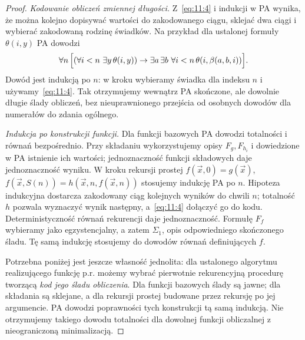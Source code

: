 \documentclass[11pt,a4paper]{article}
\numberwithin{equation}{section}
\theoremstyle{plain}
\theoremstyle{definition}
\theoremstyle{remark}
\begin{document}
\begin{proof}
\emph{Kodowanie obliczeń zmiennej długości.} Z~\eqref{eq:11:4} i indukcji w PA wynika, że można kolejno dopisywać wartości do zakodowanego ciągu, sklejać dwa ciągi i wybierać zakodowaną rodzinę świadków. Na przykład dla ustalonej formuły $\theta(i,y)$ PA dowodzi
\[
\forall n\,\Bigl[(\forall i<n\ \exists y\,\theta(i,y))
\to\exists a\,\exists b\ \forall i<n\,\theta(i,\beta(a,b,i))\Bigr].
\]
Dowód jest indukcją po $n$: w kroku wybieramy świadka dla indeksu $n$ i używamy~\eqref{eq:11:4}. Tak otrzymujemy wewnątrz PA skończone, ale dowolnie długie ślady obliczeń, bez nieuprawnionego przejścia od osobnych dowodów dla numerałów do zdania ogólnego.

\emph{Indukcja po konstrukcji funkcji.} Dla funkcji bazowych PA dowodzi totalności i równań bezpośrednio. Przy składaniu wykorzystujemy opisy $F_g,F_{h_i}$ i dowiedzione w PA istnienie ich wartości; jednoznaczność funkcji składowych daje jednoznaczność wyniku. W kroku rekursji prostej
$f(\vec x,0)=g(\vec x)$,
$f(\vec x,S(n))=h(\vec x,n,f(\vec x,n))$
stosujemy indukcję PA po $n$. Hipoteza indukcyjna dostarcza zakodowany ciąg kolejnych wyników do chwili $n$; totalność $h$ pozwala wyznaczyć wynik następny, a~\eqref{eq:11:4} dołączyć go do kodu. Deterministyczność równań rekurencji daje jednoznaczność. Formułę $F_f$ wybieramy jako egzystencjalny, a zatem $\Sigma_1$, opis odpowiedniego skończonego śladu. Tę samą indukcję stosujemy do dowodów równań definiujących $f$.

Potrzebna poniżej jest jeszcze własność jednolita: dla ustalonego algorytmu realizującego funkcję p.r. możemy wybrać pierwotnie rekurencyjną procedurę tworzącą \emph{kod jego śladu obliczenia}. Dla funkcji bazowych ślady są jawne; dla składania są sklejane, a dla rekursji prostej budowane przez rekursję po jej argumencie. PA dowodzi poprawności tych konstrukcji tą samą indukcją. Nie otrzymujemy takiego dowodu totalności dla dowolnej funkcji obliczalnej z nieograniczoną minimalizacją.
\end{proof}
\end{document}
